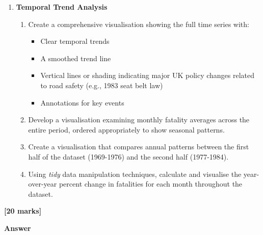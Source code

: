 \documentclass[
  10t,
]{article}
\providecommand{\tightlist}{%
  \setlength{\itemsep}{0pt}\setlength{\parskip}{0pt}}
\begin{document}
\begin{enumerate}
\def\labelenumi{\alph{enumi}.}
\setcounter{enumi}{1}
\tightlist
\item
  \textbf{Temporal Trend Analysis}

  \begin{enumerate}
  \def\labelenumii{\roman{enumii}.}
  \tightlist
  \item
    Create a comprehensive visualisation showing the full time series
    with:

    \begin{itemize}
    \tightlist
    \item
      Clear temporal trends
    \item
      A smoothed trend line
    \item
      Vertical lines or shading indicating major UK policy changes
      related to road safety (e.g., 1983 seat belt law)
    \item
      Annotations for key events
    \end{itemize}
  \item
    Develop a visualisation examining monthly fatality averages across
    the entire period, ordered appropriately to show seasonal patterns.
  \item
    Create a visualisation that compares annual patterns between the
    first half of the dataset (1969-1976) and the second half
    (1977-1984).
  \item
    Using \emph{tidy} data manipulation techniques, calculate and
    visualise the year-over-year percent change in fatalities for each
    month throughout the dataset.
  \end{enumerate}
\end{enumerate}

\textbf{{[}20 marks{]}}

\textbf{Answer}
\end{document}
